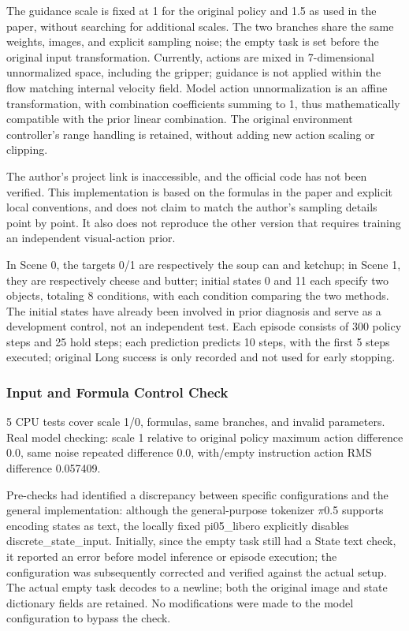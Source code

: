 The guidance scale is fixed at 1 for the original policy and 1.5 as used in the paper, without searching for additional scales. The two branches share the same weights, images, and explicit sampling noise; the empty task is set before the original input transformation. Currently, actions are mixed in 7-dimensional unnormalized space, including the gripper; guidance is not applied within the flow matching internal velocity field. Model action unnormalization is an affine transformation, with combination coefficients summing to 1, thus mathematically compatible with the prior linear combination. The original environment controller's range handling is retained, without adding new action scaling or clipping.

The author's project link is inaccessible, and the official code has not been verified. This implementation is based on the formulas in the paper and explicit local conventions, and does not claim to match the author's sampling details point by point. It also does not reproduce the other version that requires training an independent visual-action prior.

In Scene 0, the targets 0/1 are respectively the soup can and ketchup; in Scene 1, they are respectively cheese and butter; initial states 0 and 11 each specify two objects, totaling 8 conditions, with each condition comparing the two methods. The initial states have already been involved in prior diagnosis and serve as a development control, not an independent test. Each episode consists of 300 policy steps and 25 hold steps; each prediction predicts 10 steps, with the first 5 steps executed; original Long success is only recorded and not used for early stopping.

\subsubsection{Input and Formula Control Check}\label{s14-detail-9}

5 CPU tests cover scale 1/0, formulas, same branches, and invalid parameters. Real model checking: scale 1 relative to original policy maximum action difference 0.0, same noise repeated difference 0.0, with/empty instruction action RMS difference 0.057409.

Pre-checks had identified a discrepancy between specific configurations and the general implementation: although the general-purpose tokenizer \(\pi\)0.5 supports encoding states as text, the locally fixed pi05\_libero explicitly disables discrete\_state\_input. Initially, since the empty task still had a State text check, it reported an error before model inference or episode execution; the configuration was subsequently corrected and verified against the actual setup. The actual empty task decodes to a newline; both the original image and state dictionary fields are retained. No modifications were made to the model configuration to bypass the check.

